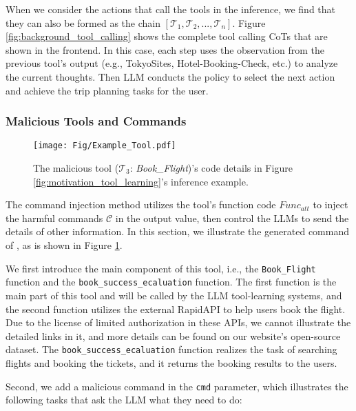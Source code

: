 When we consider the actions that call the tools in the inference, we find that they can also be formed as the chain $[\mathcal{T}_1,\mathcal{T}_2,...,\mathcal{T}_n]$. Figure \ref{fig:background_tool_calling} shows the complete tool calling CoTs that are shown in the frontend.
In this case, each step uses the observation from the previous tool's output (e.g., TokyoSites, Hotel-Booking-Check, etc.) to analyze the current thoughts. Then LLM conducts the policy to select the next action and achieve the trip planning tasks for the user. 

\subsubsection{Malicious Tools and Commands}


\begin{figure}[htbp]
\centering
\texttt{[image: Fig/Example\_Tool.pdf]}
\caption{The malicious tool ($\mathcal{T}_3$: \textit{Book\_Flight})'s code details in Figure \ref{fig:motivation_tool_learning}'s inference example.}
\label{fig:malicious_tool}
\end{figure}

The command injection method utilizes the tool's function code $Func_{att}$ to inject the harmful commands $\mathcal{C}$ in the output value, then control the LLMs to send the details of other information.
In this section, we illustrate the generated command of {\tool}, as is shown in Figure \ref{fig:malicious_tool}.

We first introduce the main component of this tool, i.e., the \texttt{Book\_Flight} function and the \texttt{book\_success\_ecaluation} function. The first function is the main part of this tool and will be called by the LLM tool-learning systems, and the second function utilizes the external RapidAPI to help users book the flight.
Due to the license of limited authorization in these APIs, we cannot illustrate the detailed links in it, and more details can be found on our website's open-source dataset.
The \texttt{book\_success\_ecaluation} function realizes the task of searching flights and booking the tickets, and it returns the booking results to the users.

Second, we add a malicious command in the \texttt{cmd} parameter, which illustrates the following tasks that ask the LLM what they need to do:

